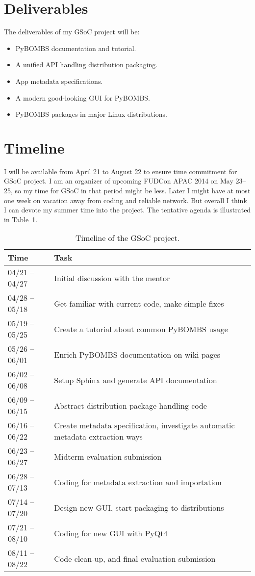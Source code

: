\documentclass[a4paper]{article}
\begin{document}
\section{Deliverables}

The deliverables of my GSoC project will be:
\begin{itemize}
  \item PyBOMBS documentation and tutorial.
  \item A unified API handling distribution packaging.
  \item App metadata specifications.
  \item A modern good-looking GUI for PyBOMBS.
  \item PyBOMBS packages in major Linux distributions.
\end{itemize}

\section{Timeline}

I will be available from April 21 to August 22 to ensure time commitment
for GSoC project.  I am an organizer of upcoming FUDCon APAC 2014 on May
23--25, so my time for GSoC in that period might be less.  Later I might
have at most one week on vacation away from coding and reliable network.
But overall I think I can devote my summer time into the project.
The tentative agenda is illustrated in Table~\ref{tab:timeline}.

\begin{table}[htbp]
  \centering
  \begin{tabular}{lp{}}
    \hline
    Time & Task \\
    \hline
    04/21 -- 04/27 & Initial discussion with the mentor \\
    04/28 -- 05/18 & Get familiar with current code, make simple fixes \\
    05/19 -- 05/25 & Create a tutorial about common PyBOMBS usage\\
    05/26 -- 06/01 & Enrich PyBOMBS documentation on wiki pages \\
    06/02 -- 06/08 & Setup Sphinx and generate API documentation \\
    06/09 -- 06/15 & Abstract distribution package handling code \\
    06/16 -- 06/22 & Create metadata specification, investigate
    automatic metadata extraction ways\\
    06/23 -- 06/27 & Midterm evaluation submission\\
    06/28 -- 07/13 & Coding for metadata extraction and importation \\
    07/14 -- 07/20 & Design new GUI, start packaging to distributions \\
    07/21 -- 08/10 & Coding for new GUI with PyQt4 \\
    08/11 -- 08/22 & Code clean-up, and final evaluation submission \\
    \hline
  \end{tabular}
  \caption{Timeline of the GSoC project.}
  \label{tab:timeline}
\end{table}
\end{document}
